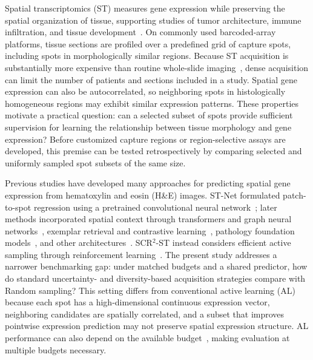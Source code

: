 \documentclass[]{spie}
\begin{document}
Spatial transcriptomics (ST) measures gene expression while preserving the spatial organization of tissue, supporting studies of tumor architecture, immune infiltration, and tissue development~\cite{stahl2016visualization,ji2020multimodal,andersson2021spatial,zhu2026comprehensive}. On commonly used barcoded-array platforms, tissue sections are profiled over a predefined grid of capture spots, including spots in morphologically similar regions. Because ST acquisition is substantially more expensive than routine whole-slide imaging~\cite{zhu2024asign}, dense acquisition can limit the number of patients and sections included in a study. Spatial gene expression can also be autocorrelated, so neighboring spots in histologically homogeneous regions may exhibit similar expression patterns. These properties motivate a practical question: can a selected subset of spots provide sufficient supervision for learning the relationship between tissue morphology and gene expression? Before customized capture regions or region-selective assays are developed, this premise can be tested retrospectively by comparing selected and uniformly sampled spot subsets of the same size.

Previous studies have developed many approaches for predicting spatial gene expression from hematoxylin and eosin (H\&E) images. ST-Net formulated patch-to-spot regression using a pretrained convolutional neural network~\cite{he2020integrating}; later methods incorporated spatial context through transformers and graph neural networks~\cite{pang2021leveraging,zeng2022spatial}, exemplar retrieval and contrastive learning~\cite{yang2023exemplar,xie2023bleep}, pathology foundation models~\cite{chen2024uni}, and other architectures~\cite{zhu2025magnet,zhu2025img2st,zhu2026duet}. SCR$^2$-ST instead considers efficient active sampling through reinforcement learning~\cite{zhu2025scr2}. The present study addresses a narrower benchmarking gap: under matched budgets and a shared predictor, how do standard uncertainty- and diversity-based acquisition strategies compare with Random sampling? This setting differs from conventional active learning (AL) because each spot has a high-dimensional continuous expression vector, neighboring candidates are spatially correlated, and a subset that improves pointwise expression prediction may not preserve spatial expression structure. AL performance can also depend on the available budget~\cite{hacohen2022active}, making evaluation at multiple budgets necessary.
\end{document}
